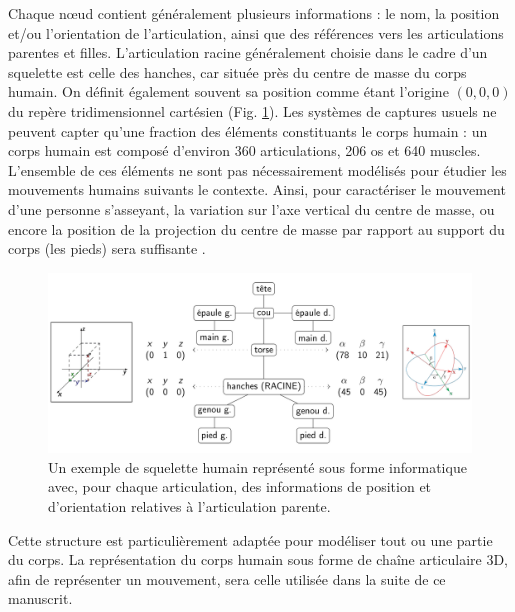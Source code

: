 Chaque nœud contient généralement plusieurs informations : le nom, la position et/ou l'orientation de l'articulation, ainsi que des références vers les articulations parentes et filles. L'articulation racine généralement choisie dans le cadre d'un squelette est celle des hanches, car située près du centre de masse du corps humain. On définit également souvent sa position comme étant l'origine  $(0,0,0)$ du repère tridimensionnel cartésien (Fig. \ref{fig:skeleton_pos_ori_example}). Les systèmes de captures usuels ne peuvent capter qu'une fraction des éléments constituants le corps humain : un corps humain est composé d'environ 360 articulations, 206 os et 640 muscles. L'ensemble de ces éléments ne sont pas nécessairement modélisés pour étudier les mouvements humains suivants le contexte. Ainsi, pour caractériser le mouvement d'une personne s'asseyant, la variation sur l'axe vertical du centre de masse, ou encore la position de la projection du centre de masse par rapport au support du corps (les pieds) sera suffisante \parencite{Salamah2015HMf}.

\begin{figure}
    \centering
    \includegraphics[width=\textwidth]{pictures/skeleton_pos_ori_example.png}
    \caption[Données d'un squelette 3D]{Un exemple de squelette humain représenté sous forme informatique avec, pour chaque articulation, des informations de position et d'orientation relatives à l'articulation parente.}
    \label{fig:skeleton_pos_ori_example}
\end{figure}

Cette structure est particulièrement adaptée pour modéliser tout ou une partie du corps. La représentation du corps humain sous forme de chaîne articulaire 3D, afin de représenter un mouvement, sera celle utilisée dans la suite de ce manuscrit.


